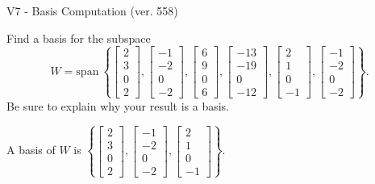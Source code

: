 \begin{exercise}
  \begin{exerciseTitle}V7 - Basis Computation (ver. 558)\end{exerciseTitle}
  \begin{exerciseStatement}
    Find a basis for the subspace 
\[W=\mathrm{span}\ \left\{\left[\begin{array}{r}
2 \\
3 \\
0 \\
2
\end{array}\right] , \left[\begin{array}{r}
-1 \\
-2 \\
0 \\
-2
\end{array}\right] , \left[\begin{array}{r}
6 \\
9 \\
0 \\
6
\end{array}\right] , \left[\begin{array}{r}
-13 \\
-19 \\
0 \\
-12
\end{array}\right] , \left[\begin{array}{r}
2 \\
1 \\
0 \\
-1
\end{array}\right] , \left[\begin{array}{r}
-1 \\
-2 \\
0 \\
-2
\end{array}\right]\right\}.\]
 Be sure to explain why your result is a basis.


  \end{exerciseStatement}
  \begin{exerciseAnswer}
   A basis of \(W\) is  \(\left\{\left[\begin{array}{r}
2 \\
3 \\
0 \\
2
\end{array}\right] , \left[\begin{array}{r}
-1 \\
-2 \\
0 \\
-2
\end{array}\right] , \left[\begin{array}{r}
2 \\
1 \\
0 \\
-1
\end{array}\right]\right\}\).
  


  \end{exerciseAnswer}
\end{exercise}